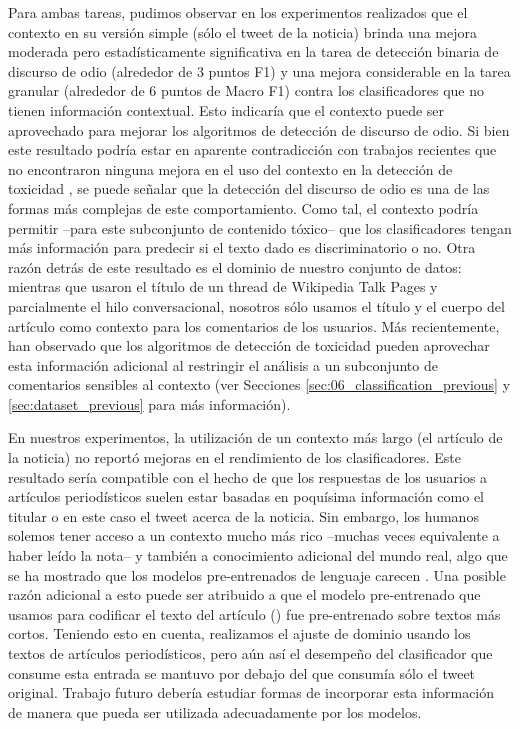 Para ambas tareas, pudimos observar en los experimentos realizados que el contexto en su versión simple (sólo el tweet de la noticia) brinda una mejora moderada pero estadísticamente significativa en la tarea de detección binaria de discurso de odio (alrededor de 3 puntos F1) y una mejora considerable en la tarea granular (alrededor de 6 puntos de Macro F1) contra los clasificadores que no tienen información contextual. Esto indicaría que el contexto puede ser aprovechado para mejorar los algoritmos de detección de discurso de odio. Si bien este resultado podría estar en aparente contradicción con trabajos recientes que no encontraron ninguna mejora en el uso del contexto en la detección de toxicidad \cite{pavlopoulos2020toxicity}, se puede señalar que la detección del discurso de odio es una de las formas más complejas de este comportamiento. Como tal, el contexto podría permitir --para este subconjunto de contenido tóxico-- que los clasificadores tengan más información para predecir si el texto dado es discriminatorio o no. Otra razón detrás de este resultado es el dominio de nuestro conjunto de datos: mientras que \citet{pavlopoulos2020toxicity} usaron el título de un thread de Wikipedia Talk Pages y parcialmente el hilo conversacional, nosotros sólo usamos el título y el cuerpo del artículo como contexto para los comentarios de los usuarios. Más recientemente, \citet{xenos-2021-context} han observado que los algoritmos de detección de toxicidad pueden aprovechar esta información adicional al restringir el análisis a un subconjunto de comentarios sensibles al contexto (ver Secciones \ref{sec:06_classification_previous} y \ref{sec:dataset_previous} para más información).

En nuestros experimentos, la utilización de un contexto más largo (el artículo de la noticia) no reportó mejoras en el rendimiento de los clasificadores. Este resultado sería compatible con el hecho de que los respuestas de los usuarios a artículos periodísticos suelen estar basadas en poquísima información como el titular o en este caso el tweet acerca de la noticia. Sin embargo, los humanos solemos tener acceso a un contexto mucho más rico --muchas veces equivalente a haber leído la nota-- y también a conocimiento adicional del mundo real, algo que se ha mostrado que los modelos pre-entrenados de lenguaje carecen \cite{logan-2019-baracks,bender2021dangers}. Una posible razón adicional a esto puede ser atribuido a que el modelo pre-entrenado que usamos para codificar el texto del artículo (\beto{}) fue pre-entrenado sobre textos más cortos. Teniendo esto en cuenta, realizamos el ajuste de dominio usando los textos de artículos periodísticos, pero aún así el desempeño del clasificador que consume esta entrada se mantuvo por debajo del que consumía sólo el tweet original. Trabajo futuro debería estudiar formas de incorporar esta información de manera que pueda ser utilizada adecuadamente por los modelos.

